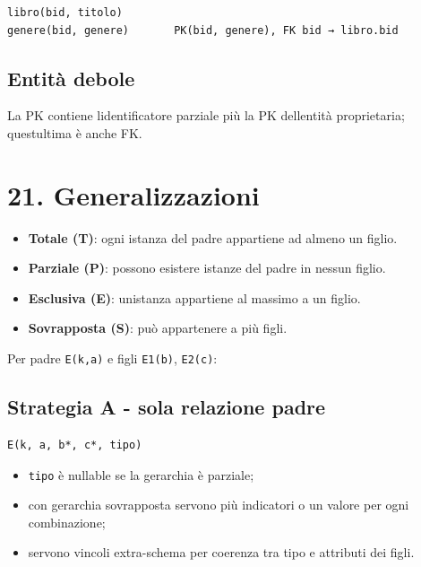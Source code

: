 \documentclass[
  10pt,
  a4paper,
]{article}
\providecommand{\tightlist}{%
  \setlength{\itemsep}{0pt}\setlength{\parskip}{0pt}}
\begin{document}
\begin{verbatim}
libro(bid, titolo)
genere(bid, genere)       PK(bid, genere), FK bid → libro.bid
\end{verbatim}

\subsection{Entità debole}\label{entituxe0-debole}

La PK contiene l\textquotesingle identificatore parziale più la PK
dell\textquotesingle entità proprietaria; quest\textquotesingle ultima è
anche FK.

\section{21. Generalizzazioni}\label{21-generalizzazioni}

\begin{itemize}
\tightlist
\item
  \textbf{Totale (T)}: ogni istanza del padre appartiene ad almeno un
  figlio.
\item
  \textbf{Parziale (P)}: possono esistere istanze del padre in nessun
  figlio.
\item
  \textbf{Esclusiva (E)}: un\textquotesingle istanza appartiene al
  massimo a un figlio.
\item
  \textbf{Sovrapposta (S)}: può appartenere a più figli.
\end{itemize}

Per padre \texttt{E(k,a)} e figli \texttt{E1(b)}, \texttt{E2(c)}:

\subsection{Strategia A - sola relazione
padre}\label{strategia-a---sola-relazione-padre}

\begin{verbatim}
E(k, a, b*, c*, tipo)
\end{verbatim}

\begin{itemize}
\tightlist
\item
  \texttt{tipo} è nullable se la gerarchia è parziale;
\item
  con gerarchia sovrapposta servono più indicatori o un valore per ogni
  combinazione;
\item
  servono vincoli extra-schema per coerenza tra tipo e attributi dei
  figli.
\end{itemize}
\end{document}
